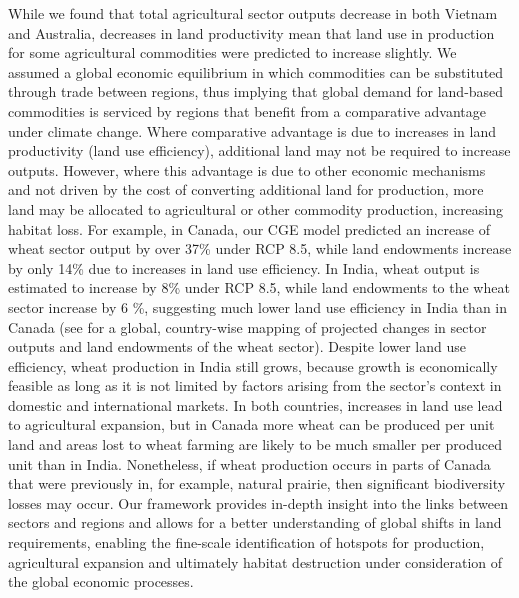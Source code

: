 While we found that total agricultural sector outputs decrease in both Vietnam and Australia, decreases in land productivity mean that land use in production for some agricultural commodities were predicted to increase slightly. We assumed a global economic equilibrium in which commodities can be substituted through trade between regions, thus implying that global demand for land-based commodities is serviced by regions that benefit from a comparative advantage under climate change. Where comparative advantage is due to increases in land productivity (land use efficiency), additional land may not be required to increase outputs. However, where this advantage is due to other economic mechanisms and not driven by the cost of converting additional land for production, more land may be allocated to agricultural or other commodity production, increasing habitat loss. For example, in Canada, our CGE model predicted an increase of wheat sector output by over 37\% under RCP 8.5, while land endowments increase by only 14\% due to increases in land use efficiency. In India, wheat output is estimated to increase by 8\% under RCP 8.5, while land endowments to the wheat sector increase by 6 \%, suggesting much lower land use efficiency in India than in Canada (see  for a global, country-wise mapping of projected changes in sector outputs and land endowments of the wheat sector). Despite lower land use efficiency, wheat production in India still grows, because growth is economically feasible as long as it is not limited by factors arising from the sector’s context in domestic and international markets. In both countries, increases in land use lead to agricultural expansion, but in Canada more wheat can be produced per unit land and areas lost to wheat farming are likely to be much smaller per produced unit than in India. Nonetheless, if wheat production occurs in parts of Canada that were previously in, for example, natural prairie, then significant biodiversity losses may occur. Our framework provides in-depth insight into the links between sectors and regions and allows for a better understanding of global shifts in land requirements, enabling the fine-scale identification of hotspots for production, agricultural expansion and ultimately habitat destruction under consideration of the global economic processes.

